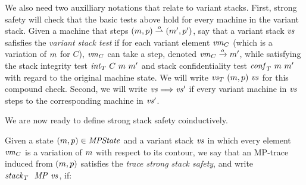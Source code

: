 \documentclass[acmsmall,review,anonymous]{acmart}\settopmatter{printfolios=true,printccs=false,printacmref=false}
\begin{document}

We also need two auxilliary notations that relate to variant stacks.
%
First, strong safety will check that the basic tests above hold for every
machine in the variant stack.  Given a machine that steps $(m,
p) \overset{o}{\rightharpoonup} (m', p')$, say that a variant
stack $\mathit{vs}$ safisfies the \emph{variant stack test} if for each
variant element $\mathit{vm}_{C}$ (which is a variation of $m$ for $C$),
$\mathit{vm}_{C}$ can take a step, denoted $\mathit{vm}_{C} \xrightarrow{o} m'$,
while satisfying the stack integrity test $\mathit{int}_T ~ C ~ m ~ m'$
and stack confidentiality test $\mathit{conf}_T ~ m ~ m'$ with regard
to the original machine state. We will write $\mathit{\mathit{vs}}_T ~ (m,
  p) ~ \mathit{vs}$ for this compound check.
%
Second, we will write $\mathit{vs} \Longrightarrow \mathit{vs}'$ if every variant machine
in $\mathit{vs}$ steps to the corresponding machine in $\mathit{vs}'$.
%

We are now ready to define strong stack safety coinductively.

 Given a state $(m, p) \in \mathit{MPState}$ and a variant stack
$\mathit{vs}$ in which every element $\mathit{vm}_{C}$ is a variation of $m$
with respect to its contour, we say that an MP-trace induced from
$(m, p)$ satisfies the \emph{trace strong stack safety}, and write
$\mathit{stack}_T ~  ~ \mathit{MP} ~ \mathit{vs}$, if:
\end{document}
